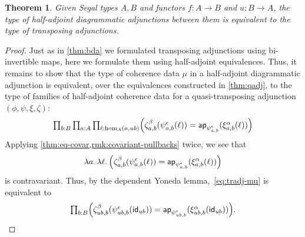 \documentclass{amsart}
\theoremstyle{plain}
\newtheorem{thm}{Theorem}[section]
\theoremstyle{definition}
\theoremstyle{remark}
\numberwithin{equation}{section}
\newcommand{\tprod}{\textstyle\prod}
\newcommand{\lam}[1]{\lambda #1.\,}
\newcommand{\idarr}[1]{\mathsf{id}_{#1}}
\newcommand{\ap}{\mathsf{ap}}                             %
\newcommand{\Parens}[1]{\Bigl(#1\Bigr)}
\begin{document}
\begin{thm}\label{thm:haa}
  Given Segal types $A,B$ and functors $f:A\to B$ and $u:B\to A$, the type of half-adjoint diagrammatic adjunctions between them is equivalent to the type of transposing adjunctions.
\end{thm}
\begin{proof}
Just as in \cref{thm:bda} we formulated transposing adjunctions using bi-invertible maps, here we formulate them using half-adjoint equivalences.
  Thus, it remains to show that the type of coherence data $\mu$ in a half-adjoint diagrammatic adjunction is equivalent, over the equivalences constructed in \cref{thm:qadj}, to the type of families of half-adjoint coherence data for a quasi-transposing adjunction $(\phi,\psi,\xi,\zeta)$:
  \begin{equation}
    \tprod_{b:B} \tprod_{a:A} \tprod_{\ell:\hom_A(a,ub)}
    \Parens{\zeta^\beta_{a,b}(\psi^{\epsilon}_{a,b}(\ell)) = \ap_{\psi^\epsilon_{a,b}}(\xi^{\alpha}_{a,b}(\ell))}\label{eq:tradj-mu}
  \end{equation}
  Applying \cref{thm:eq-covar,rmk:covariant-pullbacks} twice, we see that
  \[\lam{a}\lam{\ell} \Parens{\zeta^\beta_{a,b}(\psi^\epsilon_{a,b}(\ell)) = \ap_{\psi^\epsilon_{a,b}}(\xi^\alpha_{a,b}(\ell))}\]
  is contravariant.
  Thus, by the dependent Yoneda lemma,~\eqref{eq:tradj-mu} is equivalent to
  \begin{equation}
    \tprod_{b:B} \Parens{\zeta^\beta_{ub,b}(\psi^\epsilon_{ub,b}(\idarr{ub}))
      = \ap_{\psi^\epsilon_{ub,b}}(\xi^\alpha_{ub,b}(\idarr{ub}))}.\label{eq:tradj-mu2}
  \end{equation}


\end{proof}
\end{document}
